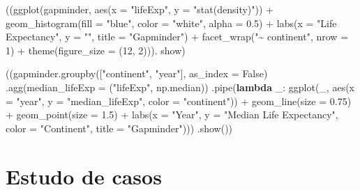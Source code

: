 \documentclass[
  portuguese,
  letterpaper,
  DIV=11,
  numbers=noendperiod]{scrreprt}
\newenvironment{Shaded}{\begin{snugshade}}{\end{snugshade}}
\newcommand{\DecValTok}[1]{\textcolor[rgb]{0.68,0.00,0.00}{#1}}
\newcommand{\FloatTok}[1]{\textcolor[rgb]{0.68,0.00,0.00}{#1}}
\newcommand{\KeywordTok}[1]{\textcolor[rgb]{0.00,0.23,0.31}{\textbf{#1}}}
\newcommand{\NormalTok}[1]{\textcolor[rgb]{0.00,0.23,0.31}{#1}}
\newcommand{\OperatorTok}[1]{\textcolor[rgb]{0.37,0.37,0.37}{#1}}
\newcommand{\StringTok}[1]{\textcolor[rgb]{0.13,0.47,0.30}{#1}}
\newcommand{\VariableTok}[1]{\textcolor[rgb]{0.07,0.07,0.07}{#1}}
\theoremstyle{definition}
\theoremstyle{remark}
\begin{document}
\begin{Shaded}
\begin{Highlighting}[]
\NormalTok{((ggplot(gapminder, aes(x }\OperatorTok{=} \StringTok{"lifeExp"}\NormalTok{, y }\OperatorTok{=} \StringTok{"stat(density)"}\NormalTok{)) }\OperatorTok{+}
\NormalTok{     geom\_histogram(fill }\OperatorTok{=} \StringTok{"blue"}\NormalTok{, color }\OperatorTok{=} \StringTok{"white"}\NormalTok{, alpha }\OperatorTok{=} \FloatTok{0.5}\NormalTok{) }\OperatorTok{+}
\NormalTok{     labs(x }\OperatorTok{=} \StringTok{"Life Expectancy"}\NormalTok{, y }\OperatorTok{=} \StringTok{""}\NormalTok{, title }\OperatorTok{=} \StringTok{"Gapminder"}\NormalTok{) }\OperatorTok{+}
\NormalTok{     facet\_wrap(}\StringTok{"\textasciitilde{} continent"}\NormalTok{, nrow }\OperatorTok{=} \DecValTok{1}\NormalTok{) }\OperatorTok{+}
\NormalTok{     theme(figure\_size }\OperatorTok{=}\NormalTok{ (}\DecValTok{12}\NormalTok{, }\DecValTok{2}\NormalTok{))).}
\NormalTok{     show)}
\end{Highlighting}
\end{Shaded}

\begin{Shaded}
\begin{Highlighting}[]
\NormalTok{((gapminder.groupby([}\StringTok{"continent"}\NormalTok{, }\StringTok{"year"}\NormalTok{], as\_index }\OperatorTok{=} \VariableTok{False}\NormalTok{)}
\NormalTok{      .agg(median\_lifeExp }\OperatorTok{=}\NormalTok{ (}\StringTok{"lifeExp"}\NormalTok{, np.median))}
\NormalTok{      .pipe(}\KeywordTok{lambda}\NormalTok{ \_: ggplot(\_, aes(x }\OperatorTok{=} \StringTok{"year"}\NormalTok{, y }\OperatorTok{=} \StringTok{"median\_lifeExp"}\NormalTok{, color }\OperatorTok{=} \StringTok{"continent"}\NormalTok{)) }\OperatorTok{+}
\NormalTok{                          geom\_line(size }\OperatorTok{=} \FloatTok{0.75}\NormalTok{) }\OperatorTok{+}
\NormalTok{                          geom\_point(size }\OperatorTok{=} \FloatTok{1.5}\NormalTok{) }\OperatorTok{+}
\NormalTok{                          labs(x }\OperatorTok{=} \StringTok{"Year"}\NormalTok{, y }\OperatorTok{=} \StringTok{"Median Life Expectancy"}\NormalTok{, color }\OperatorTok{=} \StringTok{"Continent"}\NormalTok{, title }\OperatorTok{=} \StringTok{"Gapminder"}\NormalTok{)))}
\NormalTok{                          .show())}
\end{Highlighting}
\end{Shaded}

\part{Estudo de casos}
\end{document}
